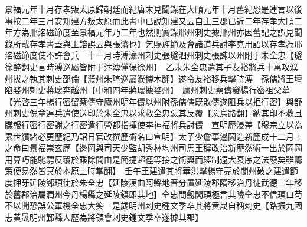 景福元年十月存孝叛太原歸朝廷而紀唐末見聞錄在大順元年十月舊紀恐是連言以後事按二年三月安知建方叛太原而此書中已說知建又云自主三郡已近二年存孝大順二年方為邢洺磁節度至景福元年乃二年也然則實錄邢州刺史據邢州亦因舊記之誤見聞錄所載存孝書蓋與王鎔誤云與張濬也】乞賜旌節及會諸道兵討李克用詔以存孝為邢洺磁節度使不許會兵　十一月時溥濠州刺史張璲泗州刺史張諫以州附于朱全忠【璲徐醉翻史言時溥巡屬皆附于汴漙僅保徐州】　乙未朱全忠遣其子友裕將兵十萬攻濮州拔之執其刺史邵倫【濮州朱瑄巡屬濮博木翻】遂令友裕移兵擊時溥　孫儒將王壇陷婺州刺史蔣瓌奔越州【中和四年蔣瓌據婺州】　廬州刺史蔡儔發楊行密祖父墓【光啓三年楊行密留蔡儔守廬州明年儔以州附孫儒儒既敗儔遂阻兵以拒行密】與舒州刺史倪章連兵遣使送印於朱全忠以求救全忠惡其反覆【惡烏路翻】納其印不救且牒報行密行密謝之行密遣行營都指揮使李神福將兵討儔　宣明歷浸差【穆宗立以為累世纘緒必更歷紀乃詔日官改撰歷術名曰宣明】太子少詹事邊岡造新歷成十二月上之命曰景福崇玄歷【邊岡與司天少監胡秀林均州司馬王穉改治新歷然術一出於岡岡用算巧能馳騁反覆於乘除間由是簡捷超徑等接之術興而經制遠大衰序之法廢矣雖籌策便易然皆冥於本原上時掌翻】　壬午王建遣其將華洪擊楊守亮於閬州破之建遣節度押牙延陵鄭頊使於朱全忠【延陵漢曲阿縣地晉分置延陵郡隋移治丹徒武德三年移於舊郡治屬潤州今丹楊縣之延陵鎮即其地】全忠問劔閣頊極言其險全忠不信頊曰苟不以聞恐誤公軍機全忠大笑　是歲明州刺史鍾文季卒其將黄晟自稱刺史【路振九國志黄晟明州鄞縣人歷為將領會刺史鍾文季卒遂據其郡】

